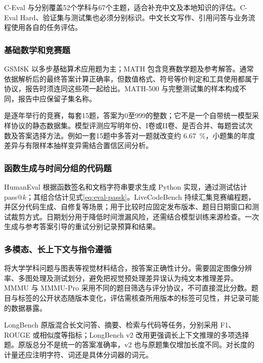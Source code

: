 \documentclass[../textbook.tex]{subfiles}
\begin{document}
C-Eval 与分别覆盖52个学科与67个主题，适合补充中文及本地知识的评估。C-Eval Hard、验证集与测试集也必须分别标识。中文长文写作、引用问答与业务流程使用各自的任务评估\cite{huang2023ceval,li2023cmmlu}。

\subsubsection{基础数学和竞赛题}
GSM8K 以多步基础算术应用题为主；MATH 包含竞赛数学题及参考解答。通常依据解析后的最终答案计算正确率，但数值格式、符号等价判定和工具使用都属于协议，报告时须连同这些项一起给出\cite{cobbe2021gsm8k,hendrycks2021math}。MATH-500 与完整测试集的样本构成不同，报告中应保留子集名称。

是逐年举行的竞赛，每套15题，答案为0至999的整数；它不是一个自带统一模型采样协议的静态数据集。模型评测应写明年份、I卷或II卷、是否合并、每题尝试次数及答案选择方法\cite{maa2026aime}。例如一套15题中多答对一题就改变约 \qty{6.67}{\percent}，小题集的年度差异与有限样本抽样变异需结合置信区间分析。

\subsubsection{函数生成与时间分组的代码题}
HumanEval 根据函数签名和文档字符串要求生成 Python 实现，通过测试估计 pass@$k$；其组合估计见式\eqref{eq:eval-passk}。LiveCodeBench 持续汇集竞赛编程题，并区分代码生成、自修复等场景；用于比较时应固定发布版本、题目日期窗口和测试裁剪方式\cite{chen2021codeeval,jain2024livecodebench}。日期划分用于降低时间泄漏风险，还需结合模型训练来源检查。一次生成与参考答案引导的重试分别记录预算和结果。

\subsubsection{多模态、长上下文与指令遵循}
将大学学科问题与图表等视觉材料结合，按答案正确性计分。需要固定图像分辨率、多图处理及测试划分，避免把视觉预处理差异误认为纯文本推理差异\cite{yue2024mmmu}。MMMU 与 MMMU-Pro 采用不同的题目筛选与评分协议，不可直接混比分数。题目与标签的公开状态随版本变化，评估需核查所用版本的标签可见性，并记录可能的数据暴露。

LongBench 原版混合长文问答、摘要、检索与代码等任务，分别采用 F1、ROUGE 或相似度等指标；LongBench v2 改用更强调长上下文推理的多项选择题。原版总分不是统一的答案准确率，v2 也与原题集仅增加长度不同\cite{bai2024longbench,bai2024longbench2}。对长度的计量还应注明字符、词还是具体分词器的词元。
\end{document}

